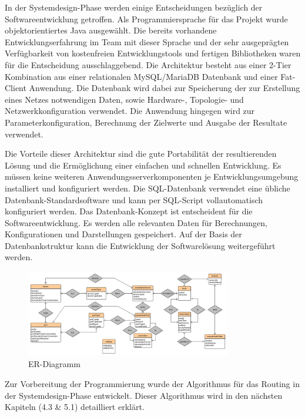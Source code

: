 \documentclass[12pt,titlepage]{article}
\begin{document}
In der Systemdesign-Phase werden einige Entscheidungen bezüglich der Softwareentwicklung getroffen. Als Programmiersprache für das Projekt wurde objektorientiertes Java ausgewählt. Die bereits vorhandene Entwicklungserfahrung im Team mit dieser Sprache und der sehr ausgeprägten Verfügbarkeit von kostenfreien Entwicklungstools und fertigen Bibliotheken waren für die Entscheidung ausschlaggebend.
Die Architektur besteht aus einer 2-Tier Kombination aus einer relationalen MySQL/MariaDB Datenbank und einer Fat-Client Anwendung. Die Datenbank wird dabei zur Speicherung der zur Erstellung eines Netzes notwendigen Daten, sowie Hardware-, Topologie- und Netzwerkkonfiguration verwendet. Die Anwendung hingegen wird zur Parameterkonfiguration, Berechnung der Zielwerte und Ausgabe der Resultate verwendet.


Die Vorteile dieser Architektur sind die gute Portabilität der resultierenden Lösung und die Ermöglichung einer einfachen und schnellen Entwicklung. Es müssen keine weiteren Anwendungsserverkomponenten je Entwicklungsumgebung installiert und konfiguriert werden. Die SQL-Datenbank verwendet eine übliche Datenbank-Standardsoftware und kann per SQL-Script vollautomatisch konfiguriert werden.
Das Datenbank-Konzept ist entscheident für die Softwareentwicklung. Es werden alle relevanten Daten für Berechnungen, Konfigurationen und Darstellungen gespeichert. Auf der Basis der Datenbankstruktur kann die Entwicklung der Softwarelösung weitergeführt werden.


\begin{figure}[!ht]
	\centering
	\includegraphics[width=0.8\textwidth]{MethSoftwareER}
	\caption{ER-Diagramm} %
	\label{fig:MethSoftwareER}
\end{figure}


Zur Vorbereitung der Programmierung wurde der Algorithmus für das Routing in der Systemdesign-Phase entwickelt.  Dieser Algorithmus wird in den nächsten Kapiteln (4.3 \& 5.1) detailliert erklärt.
\end{document}
